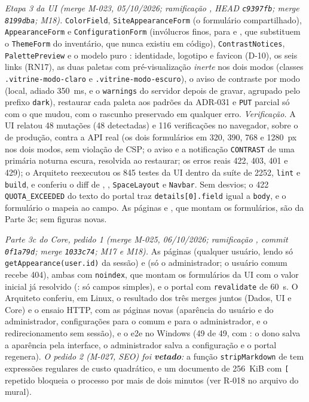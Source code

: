 \emph{Etapa 3 da UI (merge M-023, 05/10/2026; ramificação , HEAD \texttt{c9397fb}; merge \texttt{8199dba}; M18).} \texttt{ColorField}, \texttt{SiteAppearanceForm} (o formulário compartilhado), \texttt{AppearanceForm} e \texttt{ConfigurationForm} (invólucros finos, para  e , que substituem o \texttt{ThemeForm} do inventário, que nunca existiu em código), \texttt{ContrastNotices}, \texttt{PalettePreview} e o modelo puro : identidade, logotipo e favicon (D-10), os seis links (RN17), as duas paletas com pré-visualização \emph{inerte} nos dois modos (classes \texttt{.vitrine-modo-claro} e \texttt{.vitrine-modo-escuro}), o aviso de contraste por modo (local, adiado 350~ms, e o \texttt{warnings} do servidor depois de gravar, agrupado pelo prefixo \texttt{dark}), restaurar cada paleta aos padrões da ADR-031 e \texttt{PUT} parcial só com o que mudou, com o rascunho preservado em qualquer erro. \emph{Verificação.} A UI relatou 48 mutações (48 detectadas) e 116 verificações no navegador, sobre o  de produção, contra a API real (os dois formulários em 320, 390, 768 e 1280~px nos dois modos, sem violação de CSP; o aviso e a notificação \texttt{CONTRAST} de uma primária noturna escura, resolvida ao restaurar; os erros reais 422, 403, 401 e 429); o Arquiteto reexecutou os 845 testes da UI dentro da suíte de 2252, \texttt{lint} e \texttt{build}, e conferiu o diff de , , \texttt{SpaceLayout} e \texttt{Navbar}. Sem desvios; o 422 \texttt{QUOTA\_EXCEEDED} do texto do portal traz \texttt{details[0].field} igual a \texttt{body}, e o formulário o mapeia ao campo. As páginas  e , que montam os formulários, são da Parte 3c; sem figuras novas.

\emph{Parte 3c do Core, pedido 1 (merge M-025, 06/10/2026; ramificação , commit \texttt{0f1a79d}; merge \texttt{1033c74}; M17 e M18).} As páginas  (qualquer usuário, lendo só \texttt{getAppearance(user.id)} da sessão) e  (só o administrador; o usuário comum recebe 404), ambas com \texttt{noindex}, que montam os formulários da UI com o valor inicial já resolvido (: só campos simples), e o portal com \texttt{revalidate} de 60~s. O Arquiteto conferiu, em Linux, o resultado dos três merges juntos (Dados, UI e Core) e o ensaio HTTP, com as páginas novas (aparência do usuário e do administrador, configurações para o comum e para o administrador, e o redirecionamento sem sessão), e o e2e no Windows (49 de 49, com : o dono salva a aparência pela interface, o administrador salva a configuração e o portal regenera). \emph{O pedido 2 (M-027, SEO) foi \textbf{vetado}:} a função \texttt{stripMarkdown} de  tem expressões regulares de custo quadrático, e um documento de 256~KiB com \texttt{[} repetido bloqueia o processo por mais de dois minutos (ver R-018 no arquivo do mural).

